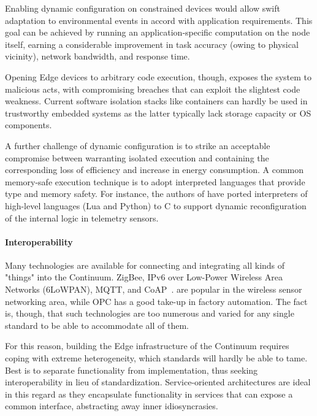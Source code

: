 Enabling dynamic configuration on constrained devices would allow swift adaptation to environmental events in accord with application requirements. 
This goal can be achieved by running an application-specific computation on the node itself, earning a considerable improvement in task accuracy (owing to physical vicinity), network bandwidth, and response time.

Opening Edge devices to arbitrary code execution, though, exposes the system to malicious acts, with compromising breaches that can exploit the slightest code weakness.
Current software isolation stacks like containers can hardly be used in trustworthy embedded systems as the latter typically lack storage capacity or OS components.

A further challenge of dynamic configuration is to strike an acceptable compromise between warranting isolated execution and containing the corresponding loss of efficiency and increase in energy consumption. 
A common memory-safe execution technique is to adopt interpreted languages that provide type and memory safety. 
For instance, the authors of \cite{brzoza2016embedded} have ported interpreters of high-level languages (Lua and Python) to C to support dynamic reconfiguration of the internal logic in telemetry sensors.

\paragraph{Interoperability}
\label{sec:interoperability}

Many technologies are available for connecting and integrating all kinds of "things" into the Continuum. 
ZigBee, IPv6 over Low-Power Wireless Area Networks (6LoWPAN), MQTT, and CoAP~\cite{naik2017choice}. are popular in the wireless sensor networking area, while OPC \cite{gruner2016restful} has a good take-up in factory automation. 
The fact is, though, that such technologies are too numerous and varied for any single standard to be able to accommodate all of them.

For this reason, building the Edge infrastructure of the Continuum requires coping with extreme heterogeneity, which standards will hardly be able to tame.
Best is to separate functionality from implementation, thus seeking interoperability in lieu of standardization. Service-oriented architectures are ideal in this regard as they encapsulate functionality in services that can expose a common interface, abstracting away inner idiosyncrasies.

